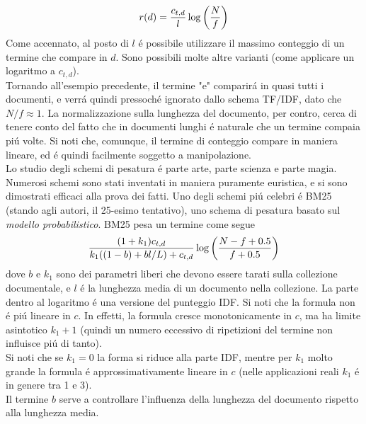 \begin{equation*}
    r(d) = \frac{c_{t, d}}{l}\log\left(\frac{N}{f}\right)
\end{equation*}
Come accennato, al posto di $l$ é possibile utilizzare il massimo conteggio di un termine che compare in $d$. Sono possibili molte altre varianti (come applicare un logaritmo a $c_{t, d}$).\\
Tornando all'esempio precedente, il termine "e" comparirá in quasi tutti i documenti, e verrá quindi pressoché ignorato dallo schema TF/IDF, dato che $N / f \approx 1$. La normalizzazione sulla lunghezza del documento, per contro, cerca di tenere conto del fatto che in documenti lunghi é naturale che un termine compaia piú volte. Si noti che, comunque, il termine di conteggio compare in maniera lineare, ed é quindi facilmente soggetto a manipolazione.\\
Lo studio degli schemi di pesatura é parte arte, parte scienza e parte magia. Numerosi schemi sono stati inventati in maniera puramente euristica, e si sono dimostrati efficaci alla prova dei fatti. Uno degli schemi piú celebri é BM25 (stando agli autori, il 25-esimo tentativo), uno schema di pesatura basato sul \textit{modello probabilistico}. BM25 pesa un termine come segue
\begin{equation*}
    \frac{(1 + k_1)c_{t, d}}{k_1((1 - b) + bl / L) + c_{t, d}}\log\left(\frac{N - f + 0.5}{f + 0.5}\right)
\end{equation*}
dove $b$ e $k_1$ sono dei parametri liberi che devono essere tarati sulla collezione documentale, e $l$ é la lunghezza media di un documento nella collezione. La parte dentro al logaritmo é una versione del punteggio IDF. Si noti che la formula non é piú lineare in $c$. In effetti, la formula cresce monotonicamente in $c$, ma ha limite asintotico $k_1 + 1$ (quindi un numero eccessivo di ripetizioni del termine non influisce piú di tanto).\\
Si noti che se $k_1 = 0$ la forma si riduce alla parte IDF, mentre per $k_1$ molto grande la formula é approssimativamente lineare in $c$ (nelle applicazioni reali $k_1$ é in genere tra 1 e 3).\\
Il termine $b$ serve a controllare l'influenza della lunghezza del documento rispetto alla lunghezza media.